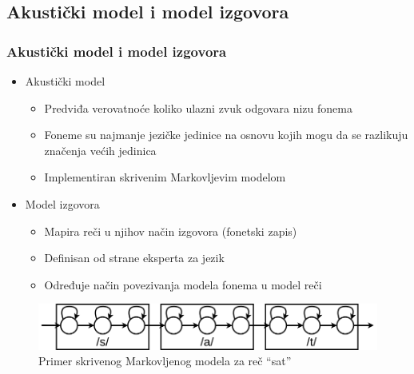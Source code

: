 \documentclass{beamer}
\begin{document}
\subsection{Akustički model i model izgovora}
\begin{frame}
  \frametitle{Akustički model i model izgovora}

  \begin{itemize}
    \item Akustički model 
    \begin{itemize}
      \item Predviđa verovatnoće koliko ulazni zvuk odgovara nizu fonema
      \item Foneme su najmanje jezičke jedinice na osnovu kojih mogu da se razlikuju značenja većih jedinica
      \item Implementiran skrivenim Markovljevim modelom
    \end{itemize}
    \item Model izgovora
    \begin{itemize}
      \item Mapira reči u njihov način izgovora (fonetski zapis)
      \item Definisan od strane eksperta za jezik
      \item Određuje način povezivanja modela fonema u model reči
    \end{itemize}
  \end{itemize}

  \begin{figure}
    \begin{center}
    \includegraphics[scale=0.3]{word_hmm.png}
    \end{center}
    \caption{Primer skrivenog Markovljenog modela za reč ``sat''}
  \end{figure}
\end{frame}
\end{document}
